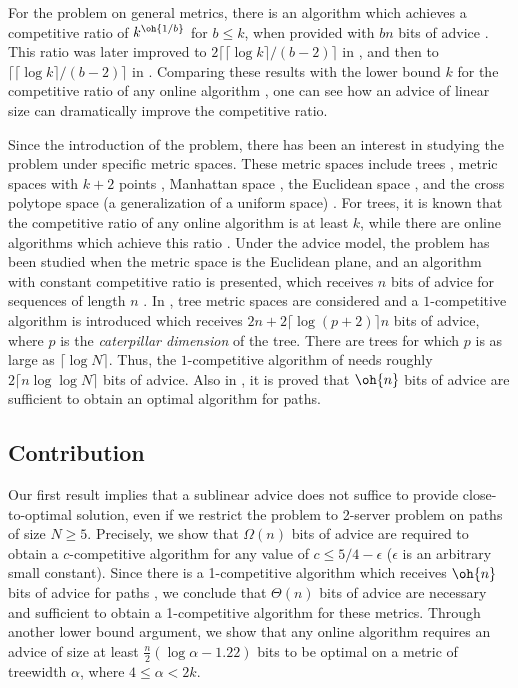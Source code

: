 For the \kc problem on general metrics, there is an algorithm which achieves a competitive ratio of $k^{\oh{1/b}}$ for $b \leq k$, when provided with $bn$ bits of advice \cite{Emek2011}. This ratio was later improved to $2  \lceil \lceil \log k \rceil / (b-2) \rceil $ in \cite{Bock11}, and then to $\lceil \lceil \log k \rceil / (b-2)  \rceil$ in \cite{WAOA11}. Comparing these results with the lower bound $k$ for the competitive ratio of any online algorithm \cite{Mana88}, one can see how an advice of linear size can dramatically improve the competitive ratio. 

Since the introduction of the \kc problem, there has been an interest in studying the problem under specific metric spaces. These metric spaces include trees \cite{Chrob91}, metric spaces with $k+2$ points \cite{Bart00}, Manhattan space \cite{Bein02}, the Euclidean space \cite{Bein02}, and the cross polytope space (a generalization of a uniform space) \cite{Bein07}. For trees, it is known that the competitive ratio of any online algorithm is at least $k$, while there are online algorithms which achieve this ratio \cite{Chrob91}. Under the advice model, the \kc problem has been studied when the metric space is the Euclidean plane, and an algorithm with constant competitive ratio is presented, which receives $n$ bits of advice for sequences of length $n$ \cite{Bock11}. In \cite{WAOA11}, tree metric spaces are considered and a $1$-competitive algorithm is introduced which receives $2 n + 2 \lceil \log (p+2) \rceil n$ bits of advice, where $p$ is the \textit{caterpillar dimension} of the tree. There are trees for which $p$ is as large as $\lceil \log N \rceil$. Thus, the $1$-competitive algorithm of \cite{WAOA11} needs roughly $2 \lceil n\log \log N \rceil$ bits of advice. Also in \cite{WAOA11}, it is proved that $\oh{n}$ bits of advice are sufficient to obtain an optimal algorithm for paths.

\subsection{Contribution}
Our first result implies that a sublinear advice does not suffice to provide close-to-optimal solution, even if we restrict the problem to 2-server problem on paths of size $N \geq 5$. Precisely, we show that $\Omega(n)$ bits of advice are required to obtain a $c$-competitive algorithm for any value of $c\leq 5/4 - \epsilon$ ($\epsilon$ is an arbitrary small constant). Since there is a 1-competitive algorithm which receives $\oh{n}$ bits of advice for paths \cite{WAOA11}, we conclude that $\Theta(n)$ bits of advice are necessary and sufficient to obtain a 1-competitive algorithm for these metrics.
Through another lower bound argument, we show that any online algorithm requires an advice of size at least $\frac{n}{2}(\log \alpha- 1.22)$ bits to be optimal on a metric of treewidth $\alpha$, where $4 \leq \alpha < 2k$.


